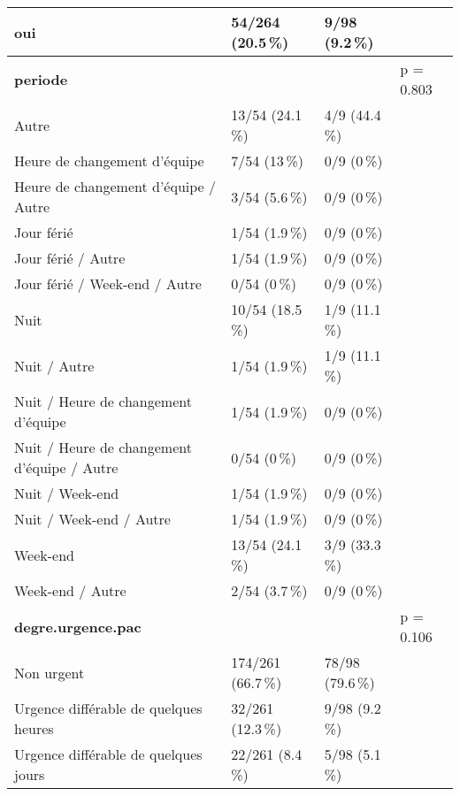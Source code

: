\documentclass[a4paper,fontsize=10pt,french]{scrartcl}
\begin{document}
\begin{longtable}[t]{l|l|l|l}
oui & 54/264 (20.5\,\%) & 9/98 (9.2\,\%) & \\
\midrule
\textbf{periode} &  &  & p = 0.803\\
 
Autre & 13/54 (24.1\,\%) & 4/9 (44.4\,\%) & \\
 
Heure de changement d'équipe & 7/54 (13\,\%) & 0/9 (0\,\%) & \\
 
Heure de changement d'équipe / Autre & 3/54 (5.6\,\%) & 0/9 (0\,\%) & \\
 
Jour férié & 1/54 (1.9\,\%) & 0/9 (0\,\%) & \\
 
Jour férié / Autre & 1/54 (1.9\,\%) & 0/9 (0\,\%) & \\
 
Jour férié / Week-end / Autre & 0/54 (0\,\%) & 0/9 (0\,\%) & \\
 
Nuit & 10/54 (18.5\,\%) & 1/9 (11.1\,\%) & \\
 
Nuit / Autre & 1/54 (1.9\,\%) & 1/9 (11.1\,\%) & \\
 
Nuit / Heure de changement d'équipe & 1/54 (1.9\,\%) & 0/9 (0\,\%) & \\
 
Nuit / Heure de changement d'équipe / Autre & 0/54 (0\,\%) & 0/9 (0\,\%) & \\
 
Nuit / Week-end & 1/54 (1.9\,\%) & 0/9 (0\,\%) & \\
 
Nuit / Week-end / Autre & 1/54 (1.9\,\%) & 0/9 (0\,\%) & \\
 
Week-end & 13/54 (24.1\,\%) & 3/9 (33.3\,\%) & \\
 
Week-end / Autre & 2/54 (3.7\,\%) & 0/9 (0\,\%) & \\
\midrule
\textbf{degre.urgence.pac} &  &  & p = 0.106\\
 
Non urgent & 174/261 (66.7\,\%) & 78/98 (79.6\,\%) & \\
 
Urgence différable de quelques heures & 32/261 (12.3\,\%) & 9/98 (9.2\,\%) & \\
 
Urgence différable de quelques jours & 22/261 (8.4\,\%) & 5/98 (5.1\,\%) & \\
 

\end{longtable}
\end{document}
